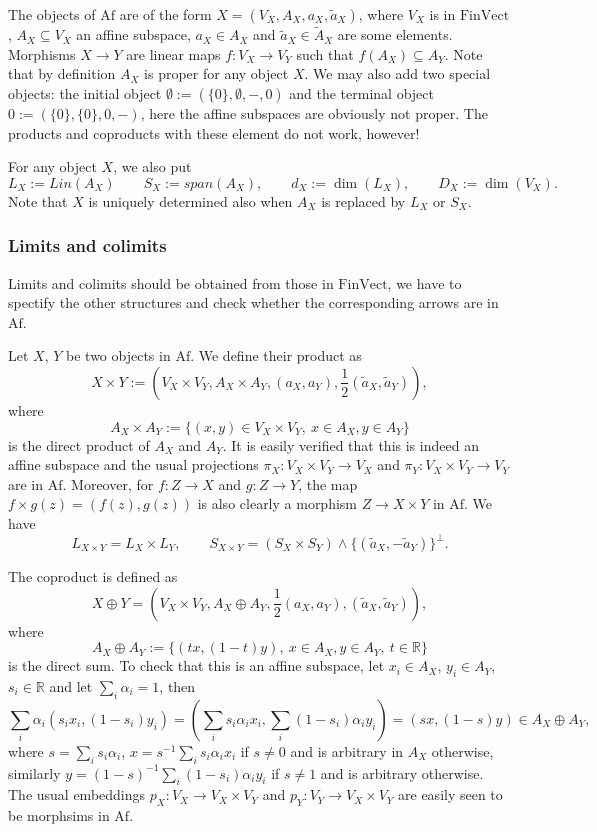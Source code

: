 \documentclass[12pt]{article}
\theoremstyle{definition}
\theoremstyle{remark}
\def \Af{\mathrm{Af}}
\def \FV{\mathrm{FinVect}}
\def\bX{ X}
\def\bY{ Y}
\def\bZ{Z}
\begin{document}
The objects of $\Af$ are of the form $X=(V_X,A_X,a_X,\tilde a_X)$, where $V_X$ is in
$\FV$, $A_X\subseteq V_X$ an affine subspace, $a_X\in A_X$ and $\tilde a_X\in \tilde A_X$
are some elements. Morphisms $X\to Y$ are linear maps $f:V_X\to V_Y$ such that
$f(A_X)\subseteq A_Y$. Note that by definition $A_X$ is proper for any object $X$. We may
also add
two special objects: the initial object $\emptyset:=(\{0\}, \emptyset, -, 0)$ and the terminal
object $0:=(\{0\},\{0\},0,-)$, here the affine subspaces are obviously not proper. The
products and coproducts with these element do not work, however!

For any object $X$, we also put 
\[
L_X:=Lin(A_X)\qquad S_X:=span(A_X),\qquad  d_X:=\dim(L_X),\qquad D_X:=\dim(V_X).
\]
Note that $X$ is
uniquely determined also when $A_X$ is replaced by $L_X$ or $S_X$. 


\subsubsection{Limits and colimits}

Limits and colimits should be obtained from those in $\FV$, we have to spectify the other
structures and check  whether the corresponding arrows are in $\Af$.  

Let $\bX$, $\bY$ be two objects in $\Af$. We define their product as
\[
\bX\times \bY:=(V_\bX\times V_\bY, A_\bX\times A_\bY, (a_X,a_Y), \frac12(\tilde a_X,\tilde
a_Y)),
\]
where 
\[
A_\bX\times A_\bY:=\{(x,y)\in V_\bX\times V_\bY,\ x\in A_\bX, y\in A_\bY\}
\]
is the direct product of $A_\bX$ and $A_\bY$. It is easily verified that this is indeed an
affine subspace and the usual projections $\pi_\bX:V_\bX\times V_\bY\to V_\bX$ and $\pi_\bY:V_\bX\times
V_\bY\to V_\bY$ are in $\Af$. Moreover, for $f:\bZ\to \bX$  and $g:\bZ\to \bY$, the map
$f\times g(z)=(f(z),g(z))$ is also clearly a morphism $\bZ\to \bX\times\bY$  in $\Af$. 
We have
\[
L_{X\times Y}=L_X\times L_Y,\qquad S_{X\times Y}= (S_X\times S_Y)\wedge \{(\tilde
a_X,-\tilde a_Y)\}^\perp.
\]


The coproduct is defined as 
\[
\bX\oplus \bY=(V_\bX\times V_\bY, A_\bX\oplus A_\bY,\frac12(a_X,a_Y), (\tilde a_X,\tilde
a_Y)),
\]
where 
\[
A_\bX\oplus A_\bY:=\{(tx,(1-t)y),\ x\in A_{\bX}, y\in A_\bY,\ t\in \mathbb R\}
\]
is the direct sum. To check that this is an affine subspace, let $x_i\in A_\bX$, $y_i\in A_\bY$, $s_i\in
\mathbb R$ and let $\sum_i\alpha_i=1$, then 
\[
\sum_i\alpha_i(s_ix_i,(1-s_i)y_i)=(\sum_is_i\alpha_ix_i,\sum_i(1-s_i)\alpha_iy_i)=(sx,(1-s)y)\in
A_\bX\oplus A_\bY,
\]
where $s=\sum_is_i\alpha_i$, $x=s^{-1}\sum_is_i\alpha_ix_i$ if $s\ne 0$ and is arbitrary
in $A_\bX$ otherwise, similarly $y=(1-s)^{-1}\sum_i(1-s_i)\alpha_iy_i$ if $s\ne 1$ and is
arbitrary otherwise. The usual embeddings  $p_\bX:V_\bX\to V_\bX\times V_\bY$ and $p_\bY:
V_{\bY}\to V_\bX\times V_\bY$ are easily seen to be morphsims in $\Af$.   
\end{document}
